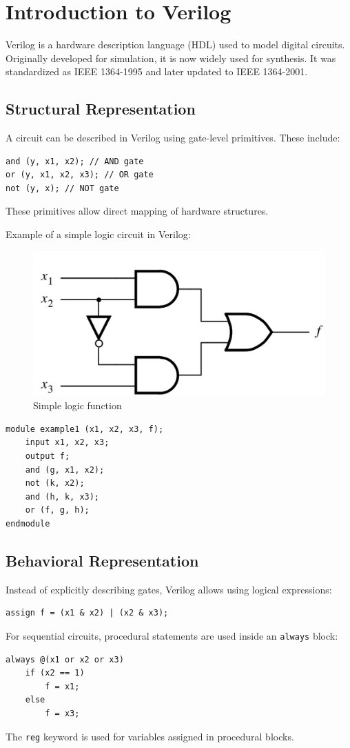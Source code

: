\documentclass[twocolumn]{article}
\begin{document}
\section{Introduction to Verilog}
Verilog is a hardware description language (HDL) used to model digital circuits. Originally developed for simulation, it is now widely used for synthesis. It was standardized as IEEE 1364-1995 and later updated to IEEE 1364-2001.

\subsection{Structural Representation}
A circuit can be described in Verilog using gate-level primitives. These include:
\begin{lstlisting}
and (y, x1, x2); // AND gate
or (y, x1, x2, x3); // OR gate
not (y, x); // NOT gate
\end{lstlisting}
These primitives allow direct mapping of hardware structures.

Example of a simple logic circuit in Verilog:

\begin{figure}[h!]
   \centering
   \includegraphics[width=0.7\linewidth]{example.jpg}
	\caption{Simple logic function}
   \label{stemplot}
\end{figure}

\begin{lstlisting}
module example1 (x1, x2, x3, f);
    input x1, x2, x3;
    output f;
    and (g, x1, x2);
    not (k, x2);
    and (h, k, x3);
    or (f, g, h);
endmodule
\end{lstlisting}

\subsection{Behavioral Representation}
Instead of explicitly describing gates, Verilog allows using logical expressions:
\begin{lstlisting}
assign f = (x1 & x2) | (x2 & x3);
\end{lstlisting}
For sequential circuits, procedural statements are used inside an \texttt{always} block:
\begin{lstlisting}
always @(x1 or x2 or x3)
    if (x2 == 1) 
        f = x1;
    else 
        f = x3;
\end{lstlisting}
The \texttt{reg} keyword is used for variables assigned in procedural blocks.
\end{document}
